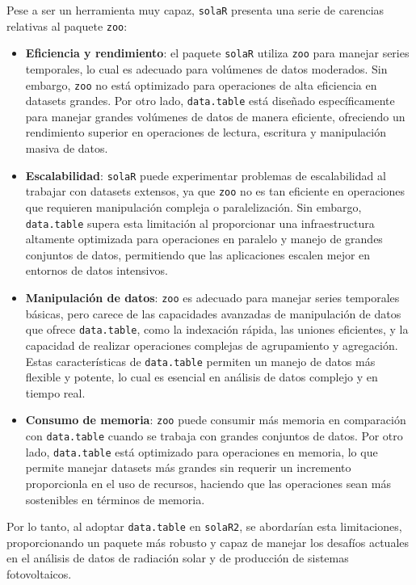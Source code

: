 Pese a ser un herramienta muy capaz, \texttt{solaR} presenta una serie de carencias relativas al paquete \texttt{zoo}:
\begin{itemize}
\item \textbf{Eficiencia y rendimiento}: el paquete \texttt{solaR} utiliza \texttt{zoo} para manejar series temporales, lo cual es adecuado para volúmenes de datos moderados. Sin embargo, \texttt{zoo} no está optimizado para operaciones de alta eficiencia en datasets grandes. Por otro lado, \texttt{data.table} está diseñado específicamente para manejar grandes volúmenes de datos de manera eficiente, ofreciendo un rendimiento superior en operaciones de lectura, escritura y manipulación masiva de datos.
\item \textbf{Escalabilidad}: \texttt{solaR} puede experimentar problemas de escalabilidad al trabajar con datasets extensos, ya que \texttt{zoo} no es tan eficiente en operaciones que requieren manipulación compleja o paralelización. Sin embargo, \texttt{data.table} supera esta limitación al proporcionar una infraestructura altamente optimizada para operaciones en paralelo y manejo de grandes conjuntos de datos, permitiendo que las aplicaciones escalen mejor en entornos de datos intensivos.
\item \textbf{Manipulación de datos}: \texttt{zoo} es adecuado para manejar series temporales básicas, pero carece de las capacidades avanzadas de manipulación de datos que ofrece \texttt{data.table}, como la indexación rápida, las uniones eficientes, y la capacidad de realizar operaciones complejas de agrupamiento y agregación. Estas características de \texttt{data.table} permiten un manejo de datos más flexible y potente, lo cual es esencial en análisis de datos complejo y en tiempo real.
\item \textbf{Consumo de memoria}: \texttt{zoo} puede consumir más memoria en comparación con \texttt{data.table} cuando se trabaja con grandes conjuntos de datos. Por otro lado, \texttt{data.table} está optimizado para operaciones en memoria, lo que permite manejar datasets más grandes sin requerir un incremento proporcionla en el uso de recursos, haciendo que las operaciones sean más sostenibles en términos de memoria.
\end{itemize}

Por lo tanto, al adoptar \texttt{data.table} en \texttt{solaR2}, se abordarían esta limitaciones, proporcionando un paquete más robusto y capaz de manejar los desafíos actuales en el análisis de datos de radiación solar y de producción de sistemas fotovoltaicos.

